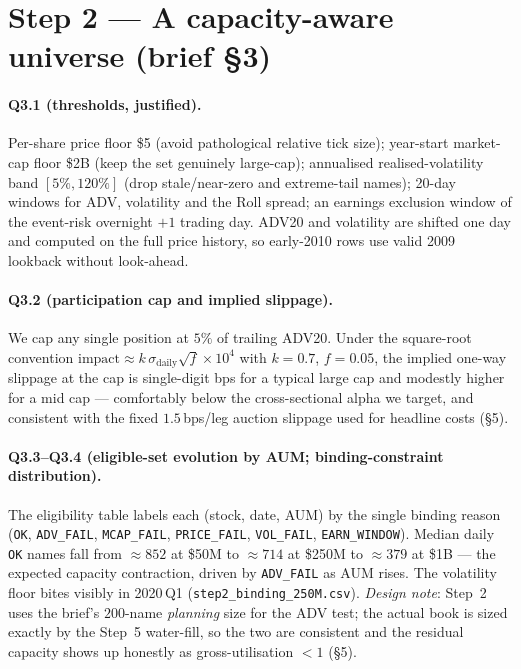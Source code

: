 \documentclass[11pt,a4paper]{article}
\newcommand{\code}[1]{\texttt{#1}}
\begin{document}
\section{Step 2 --- A capacity-aware universe (brief §3)}

\paragraph{Q3.1 (thresholds, justified).} Per-share price floor \$5 (avoid pathological relative tick size);
year-start market-cap floor \$2B (keep the set genuinely large-cap); annualised realised-volatility band
$[5\%,120\%]$ (drop stale/near-zero and extreme-tail names); 20-day windows for ADV, volatility and the Roll
spread; an earnings exclusion window of the event-risk overnight $+1$ trading day. ADV20 and volatility are
shifted one day and computed on the full price history, so early-2010 rows use valid 2009 lookback without
look-ahead.

\paragraph{Q3.2 (participation cap and implied slippage).} We cap any single position at $5\%$ of trailing
ADV20. Under the square-root convention $\text{impact}\approx k\,\sigma_{\text{daily}}\sqrt{f}\times10^4$ with
$k=0.7$, $f=0.05$, the implied one-way slippage at the cap is single-digit bps for a typical large cap and
modestly higher for a mid cap --- comfortably below the cross-sectional alpha we target, and consistent with
the fixed $1.5$\,bps/leg auction slippage used for headline costs (\S5).

\paragraph{Q3.3--Q3.4 (eligible-set evolution by AUM; binding-constraint distribution).} The eligibility
table labels each (stock, date, AUM) by the single binding reason (\code{OK}, \code{ADV\_FAIL},
\code{MCAP\_FAIL}, \code{PRICE\_FAIL}, \code{VOL\_FAIL}, \code{EARN\_WINDOW}). Median daily \code{OK} names
fall from $\approx852$ at \$50M to $\approx714$ at \$250M to $\approx379$ at \$1B --- the expected capacity
contraction, driven by \code{ADV\_FAIL} as AUM rises. The volatility floor bites visibly in 2020\,Q1
(\code{step2\_binding\_250M.csv}). \emph{Design note}: Step~2 uses the brief's $200$-name \emph{planning} size
for the ADV test; the actual book is sized exactly by the Step~5 water-fill, so the two are consistent and the
residual capacity shows up honestly as gross-utilisation $<1$ (\S5).
\end{document}
